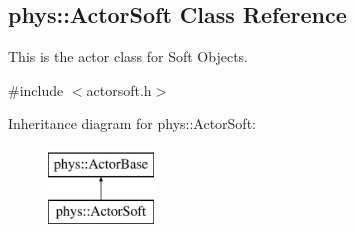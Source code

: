 \hypertarget{classphys_1_1ActorSoft}{
\subsection{phys::ActorSoft Class Reference}
\label{d4/d23/classphys_1_1ActorSoft}
}


This is the actor class for Soft Objects.  




{\ttfamily \#include $<$actorsoft.h$>$}

Inheritance diagram for phys::ActorSoft:\begin{figure}[H]
\begin{center}
\leavevmode
\includegraphics[height=2.000000cm]{d4/d23/classphys_1_1ActorSoft}
\end{center}
\end{figure}

